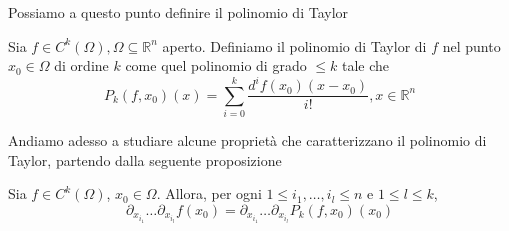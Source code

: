 Possiamo a questo punto definire il polinomio di Taylor

\vspace{0.5cm}
\begin{definition}[\textcolor{blue}{polinomio di Taylor di $f$ in $x_0$ di ordine $k$}]
Sia $f \in C^{k}(\Omega), \Omega \subseteq \mathbb{R}^n$ aperto. Definiamo il polinomio di Taylor di $f$ nel punto $x_0 \in \Omega$ di ordine $k$ come quel polinomio di grado $\leq k$ tale che
$$
P_k(f, x_0)(x) = \sum_{i=0}^k \frac{d^i f(x_0)(x-x_0)}{i!}, x \in \mathbb{R}^n
$$
\end{definition}

Andiamo adesso a studiare alcune proprietà che caratterizzano il polinomio di Taylor, partendo dalla seguente proposizione

\begin{prop}
\label{prop:caratterizzazione_taylor}
Sia $f \in C^k(\Omega)$, $x_0 \in \Omega$. Allora, per ogni $1 \leq i_1, \ldots, i_l \leq n$ e $1 \leq l \leq k$,
$$
\partial_{x_{i_1}} \ldots \partial_{x_{i_l}} f(x_0) = \partial_{x_{i_1}} \ldots \partial_{x_{i_l}} P_k(f, x_0)(x_0)
$$
\end{prop}

